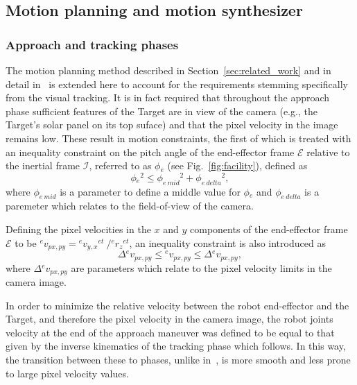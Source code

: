 \subsection{Motion planning and motion synthesizer}
%
\subsubsection{Approach and tracking phases}
The motion planning method described in Section~\ref{sec:related_work} and in detail in~\cite{lampariello2013generating} is extended here to account for the requirements stemming specifically from the visual tracking. It is in fact required that throughout the approach phase sufficient features of the Target are in view of the camera (e.g., the Target's solar panel on its top suface) and that the pixel velocity in the image remains low. These result in motion constraints, the first of which is treated with an inequality constraint on the pitch angle of the end-effector frame $\mathcal{E}$ relative to the inertial frame $\mathcal{I}$, referred to as $\phi{}_{e}$ (see Fig.~\ref{fig:facility}), defined as
\begin{equation}
\phi{}_{e}{}^{2} \leq \phi_{e \: mid}{}^{2} + \phi_{e \: delta}{}^{2},
\end{equation}
where $\phi_{e \: mid}$ is a parameter to define a middle value for $\phi{}_{e}$ and $\phi_{e \: delta}$ is a paremeter which relates to the field-of-view of the camera. 

Defining the pixel velocities in the $x$ and $y$ components of the end-effector frame $\mathcal{E}$ to be ${}^{e}v{}_{px, py}={}^{e}v{}_{y, x}{}^{et}\ / {}^{e}r{}_{z}{}^{et}$, an inequality constraint is also introduced as
\begin{equation}
\Delta {}^{e}v{}_{px, py}  \leq {}^{e}v{}_{px, py} \leq \Delta {}^{e}v{}_{px, py},
\end{equation}
where $\Delta {}^{e}v{}_{px, py}$ are parameters which relate to the pixel velocity limits in the camera image. 


In order to minimize the relative velocity between the robot end-effector and the Target, and therefore the pixel velocity in the camera image, the robot joints velocity at the end of the approach maneuver was defined to be equal to that given by the inverse kinematics of the tracking phase which follows. In this way, the transition between these to phases, unlike in~\cite{lampariello2013generating}, is more smooth and less prone to large pixel velocity values.

